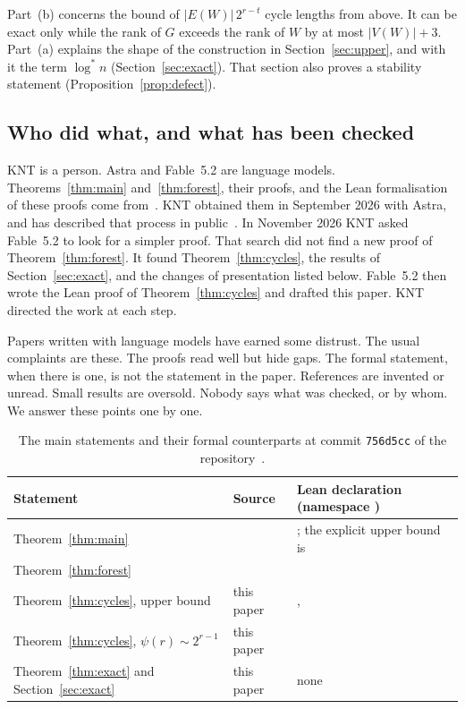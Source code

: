 \documentclass[11pt]{article}
\theoremstyle{definition}
\theoremstyle{remark}
\newcommand{\lgs}{\log^{*}}
\begin{document}
Part~(b) concerns the bound of $|E(W)|\,2^{r-t}$ cycle lengths from above. It can be exact only
while the rank of $G$ exceeds the rank of $W$ by at most $|V(W)|+3$. Part~(a) explains the shape of
the construction in Section~\ref{sec:upper}, and with it the term $\lgs n$
(Section~\ref{sec:exact}). That section also proves a stability statement
(Proposition~\ref{prop:defect}).

\subsection{Who did what, and what has been checked}\label{sec:status}

KNT is a person. Astra and Fable~5.2 are language models. Theorems~\ref{thm:main}
and~\ref{thm:forest}, their proofs, and the Lean formalisation of these proofs come
from~\cite{KNT}. KNT obtained them in September 2026 with Astra, and has described that process in
public~\cite{Claim}. In November 2026 KNT asked Fable~5.2 to look for a simpler proof. That search
did not find a new proof of Theorem~\ref{thm:forest}. It found Theorem~\ref{thm:cycles}, the results
of Section~\ref{sec:exact}, and the changes of presentation listed below. Fable~5.2 then wrote the
Lean proof of Theorem~\ref{thm:cycles} and drafted this paper. KNT directed the work at each step.

Papers written with language models have earned some distrust. The usual complaints are these. The
proofs read well but hide gaps. The formal statement, when there is one, is not the statement in the
paper. References are invented or unread. Small results are oversold. Nobody says what was checked,
or by whom. We answer these points one by one.

\begin{table}[ht]
\centering\small
\renewcommand{\arraystretch}{1.15}
\begin{tabular}{@{}L{4.3cm}L{1.9cm}L{9.2cm}@{}}
\toprule
Statement & Source & Lean declaration (namespace ) \\
\midrule
Theorem~\ref{thm:main} & \cite{KNT} & ; the explicit upper bound is
   \\
Theorem~\ref{thm:forest} & \cite{KNT} &  \\
Theorem~\ref{thm:cycles}, upper bound & this paper & ,
   \\
Theorem~\ref{thm:cycles}, $\psi(r)\sim2^{r-1}$ & this paper &  \\
Theorem~\ref{thm:exact} and Section~\ref{sec:exact} & this paper & none \\
\bottomrule
\end{tabular}
\caption{The main statements and their formal counterparts at commit \texttt{756d5cc} of the
repository~\cite{Repo}.}\label{tab:status}
\end{table}
\end{document}
